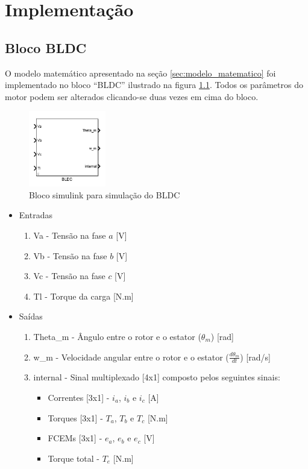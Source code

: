\chapter{Implementação}

    \section{Bloco BLDC}
        O modelo matemático apresentado na seção \ref{sec:modelo_matematico} foi implementado no bloco ``BLDC'' ilustrado na figura \ref{fig:bloco_BLDC}. Todos os parâmetros do motor podem ser alterados clicando-se duas vezes em cima do bloco.
        \begin{figure}[ht]
            \centering
            \includegraphics[width=0.3\textwidth]{bloco_BLDC}
            \caption{Bloco simulink para simulação do BLDC}
            \label{fig:bloco_BLDC}
        \end{figure}

        \begin{itemize}
            \item Entradas
            \begin{enumerate}
                \item Va - Tensão na fase $a$ [V]
                \item Vb - Tensão na fase $b$ [V]
                \item Vc - Tensão na fase $c$ [V]
                \item Tl - Torque da carga [N.m]
            \end{enumerate}
            \item Saídas
            \begin{enumerate}
                \item Theta\_m - Ângulo entre o rotor e o estator ($\theta_m$) [rad]
                \item w\_m - Velocidade angular entre o rotor e o estator ($\frac{d\theta_m}{dt}$) [rad/s]
                \item internal - Sinal multiplexado [4x1] composto pelos seguintes sinais:
                \begin{itemize}
                    \item Correntes [3x1] - $i_a$, $i_b$ e $i_c$ [A]
                    \item Torques [3x1] - $T_a$, $T_b$ e $T_c$ [N.m]
                    \item FCEMs [3x1] - $e_a$, $e_b$ e $e_c$ [V]
                    \item Torque total - $T_e$ [N.m]
                \end{itemize}
            \end{enumerate}
        \end{itemize}

